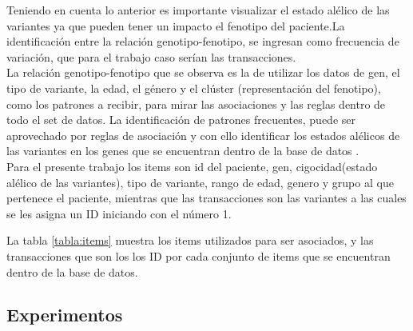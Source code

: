 Teniendo en cuenta lo anterior es importante visualizar el estado alélico de las variantes \cite{Hannah-Shmouni2015,Laboratories2015} ya que pueden tener un impacto el fenotipo del paciente.La identificación entre la relación genotipo-fenotipo, se ingresan como frecuencia de variación, que para el trabajo caso serían las transacciones\cite{Breuer2017}.\\

La relación genotipo-fenotipo que se observa es  la de utilizar los datos de gen, el tipo de variante, la edad, el género y el clúster (representación del fenotipo), como los patrones a recibir, para mirar las asociaciones y las reglas dentro de todo el set de datos. La identificación de patrones frecuentes, puede ser aprovechado por reglas de asociación y con ello identificar los estados alélicos de las variantes en los genes que se encuentran dentro de la base de datos \cite{breuler2017}.\\

Para el presente trabajo los items son id del paciente, gen, cigocidad(estado alélico de las variantes), tipo de variante, rango de edad, genero y grupo al que pertenece el paciente, mientras que las transacciones son las variantes a las cuales se les asigna un ID iniciando con el número 1.

\begin{table}[H]
	\centering
\caption{ Tabla de items y transacciones}
\label{tabla:items}
\end{table}
 
La tabla \ref{tabla:items} muestra los items utilizados para ser asociados, y las transacciones que son los los ID por cada conjunto de items que se encuentran dentro de la base de datos.

\subsection{Experimentos}

